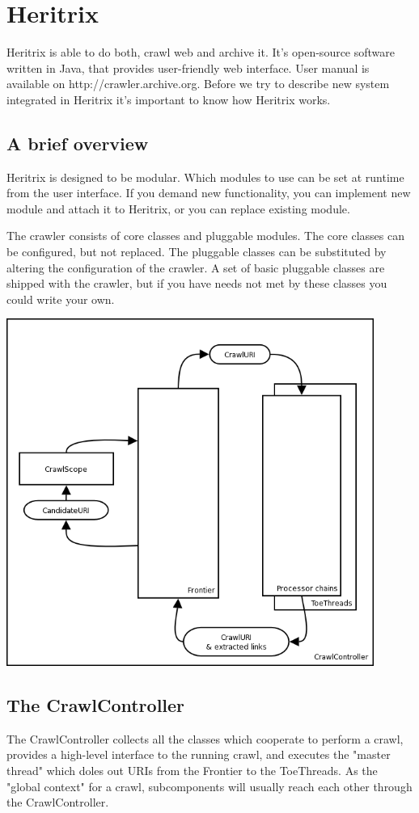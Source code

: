 \documentclass[11pt,a4paper]{article}
\begin{document}
\newpage
\section{Heritrix}

Heritrix is able to do both, crawl web and archive it. It's open-source software written in Java, that provides user-friendly web interface. User manual is available on http://crawler.archive.org. Before we try to describe new system integrated in Heritrix it's important to know how Heritrix works.

\subsection{A brief overview}
Heritrix is designed to be modular. Which modules to use can be set at runtime from the user interface. If you demand new functionality, you can implement new module and attach it to Heritrix, or you can replace existing module.

The crawler consists of core classes and pluggable modules. The core classes can be configured, but not replaced. The pluggable classes can be substituted by altering the configuration of the crawler. A set of basic pluggable classes are shipped with the crawler, but if you have needs not met by these classes you could write your own.

\includegraphics[width=120mm]{crawler_overview1.png}

\subsection{The CrawlController}
The CrawlController collects all the classes which cooperate to perform a crawl, provides a high-level interface to the running crawl, and executes the "master thread" which doles out URIs from the Frontier to the ToeThreads. As the "global context" for a crawl, subcomponents will usually reach each other through the CrawlController.
\end{document}
